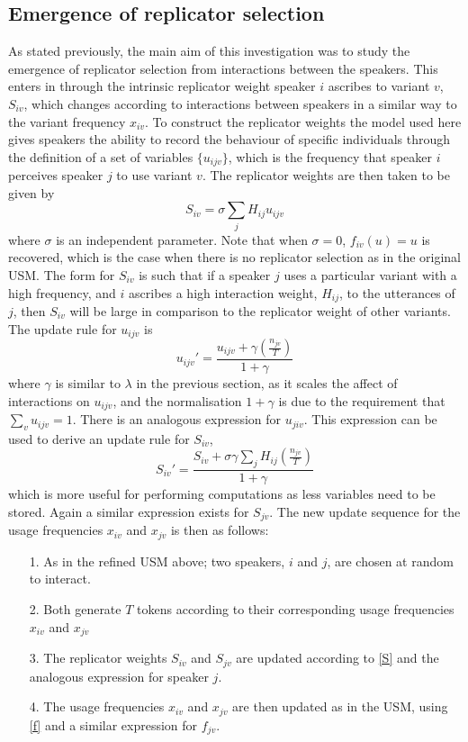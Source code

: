 \documentclass[12pt]{article}
\begin{document}
\subsection{Emergence of replicator selection}
As stated previously, the main aim of this investigation was to study the emergence of replicator selection from interactions between the speakers. This enters in through the intrinsic replicator weight speaker $i$ ascribes to variant $v$, $S_{iv}$, which changes according to interactions between speakers in a similar way to the variant frequency $x_{iv}$. To construct the replicator weights the model used here gives speakers the ability to record the behaviour of specific individuals through the definition of a set of variables $\{u_{ijv}\}$, which is the frequency that speaker $i$ perceives speaker $j$ to use variant $v$. The replicator weights are then taken to be given by
\begin{equation}
S_{iv} = \sigma \sum\limits_{j} H_{ij}u_{ijv}
\end{equation}
where $\sigma$ is an independent parameter. Note that when $\sigma = 0 $, $f_{iv}(u) = u$ is recovered, which is the case when there is no replicator selection as in the original USM. The form for $S_{iv}$ is such that if a speaker $j$ uses a particular variant with a high frequency, and $i$ ascribes a high interaction weight, $H_{ij}$, to the utterances of $j$, then $S_{iv}$ will be large in comparison to the replicator weight of other variants. The update rule for $u_{ijv}$ is
\begin{equation}\label{u}
u_{ijv}' = \frac{u_{ijv} + \gamma (\frac{n_{jv}}{T})}{1 + \gamma}
\end{equation}
where $\gamma$ is similar to $\lambda$ in the previous section, as it scales the affect of interactions on $u_{ijv}$, and the normalisation $1 + \gamma$ is due to the requirement that $\sum\limits_{v} u_{ijv} = 1$. There is an analogous expression for $u_{jiv}$. This expression can be used to derive an update rule for $S_{iv}$, 
\begin{equation}\label{S}
S_{iv}' = \frac{S_{iv} + \sigma \gamma \sum\limits_{j} H_{ij}(\frac{n_{jv}}{T})}{1 + \gamma}
\end{equation}
which is more useful for performing computations as less variables need to be stored. Again a similar expression exists for $S_{jv}$. The new update sequence for the usage frequencies $x_{iv}$ and $x_{jv}$ is then as follows:
\begin{itemize}
\item[1.] As in the refined USM above; two speakers, $i$ and $j$, are chosen at random to interact.
\item[2.] Both generate $T$ tokens according to their corresponding usage frequencies $x_{iv}$ and $x_{jv}$
\item[3.] The replicator weights $S_{iv}$ and $S_{jv}$ are updated according to \eqref{S} and the analogous expression for speaker $j$.
\item[4.] The usage frequencies $x_{iv}$ and $x_{jv}$ are then updated as in the USM, using \eqref{f} and a similar expression for $f_{jv}$.
\end{itemize}
\end{document}
